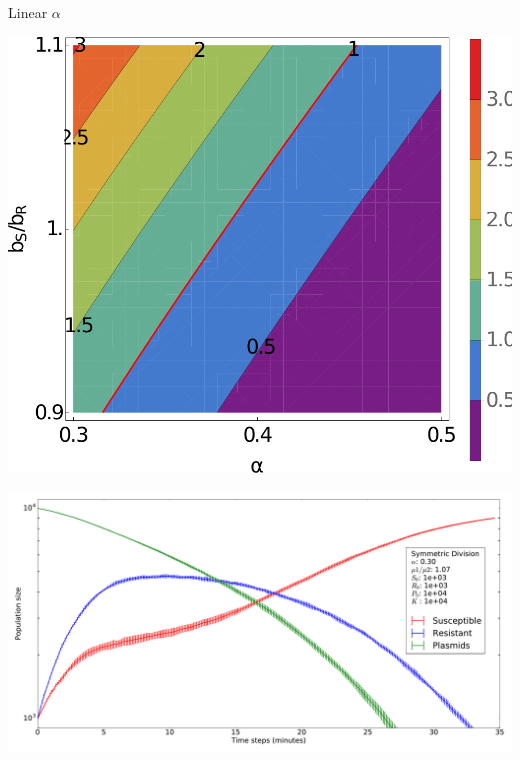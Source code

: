 \documentclass[final]{beamer}
\newlength{\onecolwid}
\newlength{\figwid}
\begin{document}
\begin{frame}[t]
\begin{block}
\begin{columns}[t]
\begin{column}{\onecolwid}
  \begin{block}{Linear $\alpha$}
    \begin{center}
      \includegraphics[width=\figwid]{../dev/graphics/poster/linear_contour.pdf}

      \includegraphics[width=\figwid]{../dev/graphics/poster/linear_pop.pdf}
    \end{center}


\end{block}
\end{column}
\end{columns}
\end{block}
\end{frame}
\end{document}
